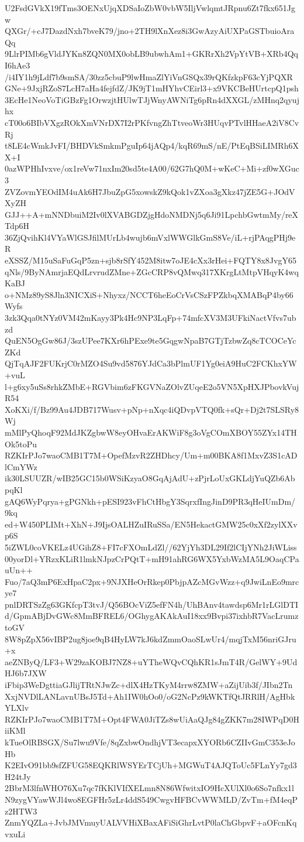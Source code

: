 U2FsdGVkX19fTms3OENxUjqXDSaIoZbW0vbW5IljVwlqmtJRpnu6Zt7fkx651Jgw
QXGr/+cJ7DazdNxh7bveK79/jno+2TH9lXnXez8i3GwAzyAiUXPaGSTbuioAraQq
9LlrPIMb6gVldJYKn8ZQN0MX0obLB9ubwhAm1+GKRrXh2VpYtVB+XRb4QqI6hAe3
/i4IY1h9jLdf7b9smSA/30zz5cbuP9lwHmaZlYiVnGSQx39rQKfzkpF63cYjPQXR
GNe+9JxjRZoS7LcH7aHa4fejfdZ/JK9jT1mHYhvCEirl3+x9VKCBeHUrtcpQ1psh
3EcHe1NeoVoTiGBzFg1OrwzjtHUlwTJjWnyAWNiTg6pRn4dXXGL/zMHnq2qyujhx
cT00o6BIbVXgzROkXmVNrDX7I2rPKfvngZhTtveoWr3HUqvPTvlHHaeA2iV8CvRj
t8LE4cWmkJvFI/BHDVkSmkmPguIp64jAQp4/kqR69mS/nE/PtEqBSiLIMRh6XX+I
0azWPHhIvxve/ox1reVw71nxIm20sd5te4A00/62G7hQ0M+wKeC+Mi+zf0wXGuc3
ZVZovmYEOdIM4uAk6H7JbuZpG5xowskZ9kQok1vZXoa3gXkz47jZE5G+JOdVXyZH
GJJ++A+mNNDbuiM2Iv0lXVABGDZjgHdoNMDNj5q6Ji91LpchbGwtmMy/reXTdp6H
36ZjQvihKl4VYaWlGSJfilMUrLb4wujb6mVxlWWGlkGmS8Ve/iL+rjPAqgPHj9eR
eXSSZ/M15uSaFuGqP5zn+sjb8rSfY452M8itw7oJE4cXx3rHei+FQTY8x8JvgY65
qNls/9ByNAmrjaEQdLrvrudZMne+ZGcCRP8vQMwq317XKrgLtMtpVHqyK4wqKaBJ
o+NMz89yS8Jln3NICXiS+Nhyxz/NCCT6heEoCrVsCSzFPZkbqXMABqP4by66Wyfs
3zk3Qqa0tNYz0VM42mKayy3Pk4Hc9NP3LqFp+74mfcXV3M3UFkiNactVfvs7ubzd
QuEN5OgGw86J/3szUPee7KXr6hPExe9te5GqgwNpaB7GTjTzbwZq8cTCOCeYcZKd
QjTqAJF2FUKrjC0rMZO4Su9vd5876YJdCa3bPlmUF1Yg0eiA9HuC2FCKhxYW+vuL
l+g6xy5uSs8rhkZMbE+RGVbim6zFKGVNaZOlvZUqeE2o5VN5XpHXJPbovkVujR54
XoKXi/f/Bz99Au4JDB717Wusv+pNp+nXqc4iQDvpVTQ0fk+sQr+Dj2t7SLSRy8Wj
mMlPyQhoqF92MdJKZgbwW8eyOHvaErAKWiF8g3oVgCOmXBOY55ZYx14THOk5toPu
RZKIrPJo7waoCMB1T7M+OpefMzvR2ZHDhcy/Um+m00BKA8f1MxvZ3S1cADlCmYWz
ik30LSUUZR/wIB25GC15b0WSiKzyaO8GqAjAdU+zPjrLoUxGKLdjYuQZb6AbpqKl
gAQ6WyPqrya+gPGNkh+pESI923vFhCtHbgY3SqrxfIngJinD9PR3qHeIUmDm/9kq
ed+W450PLIMt+XhN+J9IjsOALHZuIRuSSa/EN5HekactGMW25c0xXf2zylXXvp6S
5iZWL0coVKELz4UGihZ8+FI7cFXOmLdZl//62YjYh3DL29If2lCIjYNh2JiWLiss
00yorDl+YRzxKLiR1lmkNJpzCrPQtT+mH91ahRG6WX5YxbWzMA5L9OaqCPauUn++
Fuo/7aQ3mP6ExHpaC2px+9NJXHeOrRkep0PbjpAZcMGvWzz+q9JwiLnEo9mrcye7
pnlDRTSzZg63GKfcpT3tvJ/Q56BOcViZ5efFN4h/UhBAnv4tawdsp6Mr1rLGlDTI
d/GpmABjDvGWc8MmBFREL6/OGhygAKAkAuI18xx9Bvpi37ixhbR7VacLrumztoGV
8W8pZpX56vIBP2ug8joe9qB4HyLW7kJ6kdZmmOaoSLwUr4/mqjTxM56nriGJru+x
aeZNByQ/LF3+W29zaKOBJ7NZ8+uYTheWQvCQhKR1sJmT4R/GelWY+9UdHJ6b7JXW
iFbip3WeDgttiaGJlijTRtNJwZc+dlX4HzTKyM4rrw8ZMW+aZijUib3f/JIbn2Tn
XxjNVDlLANLavnUBsJ5Td+Ah1IW0hOo0/oG2NcPz9kWKTfQtJRRlH/AgHbkYLXlv
RZKIrPJo7waoCMB1T7M+Opt4FWA0JiTZs8wUiAaQJg84gZKK7m28IWPqD0HiiKMl
kTueOlRBSGX/Su7lwu9Vfe/8qZxbwOndhjVT3ecapxXYORb6CZIIvGmC353eJoHb
K2EIvO91bb9sfZFUG58EQKRlWSYErTCjUh+MGWuT4AJQToUc5FLnYy7gd3H24tJy
2BbrM3lfnWHO76Xu7qc7fKKlVIfXELmn8N86WfwitxIO9HcXUlXl0o6So7nfkx1l
N9zygVYawWJl4wo8EGFHr5zLr4ddS549CwgvHFBCvWWMLD/ZvTm+fM4eqPz2HTW3
ZnmYQZLa+JvbJMVmuyUALVVHiXBaxAFiSiGhrLvtP0laChGbpvF+aOFcnKqvxuLi
